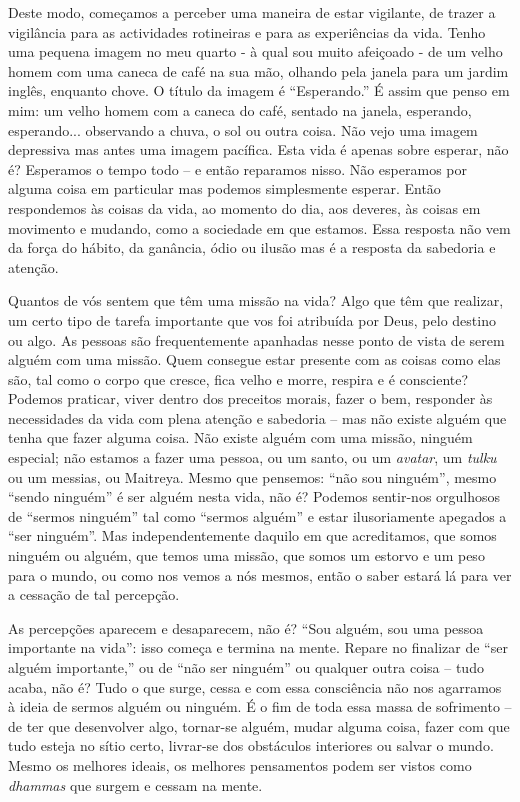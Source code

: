 Deste modo, começamos a perceber uma maneira de estar vigilante, de
trazer a vigilância para as actividades rotineiras e para as
experiências da vida. Tenho uma pequena imagem no meu quarto - à qual
sou muito afeiçoado - de um velho homem com uma caneca de café na sua
mão, olhando pela janela para um jardim inglês, enquanto chove. O título
da imagem é ``Esperando.'' É assim que penso em mim: um velho homem com
a caneca do café, sentado na janela, esperando, esperando... observando
a chuva, o sol ou outra coisa. Não vejo uma imagem depressiva mas antes
uma imagem pacífica. Esta vida é apenas sobre esperar, não é? Esperamos
o tempo todo -- e então reparamos nisso. Não esperamos por alguma coisa
em particular  mas podemos simplesmente esperar. Então respondemos às
coisas da vida, ao momento do dia, aos deveres, às coisas em movimento e
mudando, como a sociedade em que estamos. Essa resposta não vem da força
do hábito, da ganância, ódio ou ilusão mas é a resposta da sabedoria e
atenção.

Quantos de vós sentem que têm uma missão na vida? Algo que têm que
realizar, um certo tipo de tarefa importante que vos foi atribuída por
Deus, pelo destino ou algo. As pessoas são frequentemente apanhadas
nesse ponto de vista de serem alguém com uma missão. Quem consegue estar
presente com as coisas como elas são, tal como o corpo que cresce, fica
velho e morre, respira e é consciente? Podemos praticar, viver dentro
dos preceitos morais, fazer o bem, responder às necessidades da vida com
plena atenção e sabedoria -- mas não existe alguém que tenha que fazer
alguma coisa. Não existe alguém com uma missão, ninguém especial; não
estamos a fazer uma pessoa, ou um santo, ou um \emph{avatar}, um
\emph{tulku} ou um messias, ou Maitreya. Mesmo que pensemos: ``não sou
ninguém'', mesmo ``sendo ninguém'' é ser alguém nesta vida, não é?
Podemos sentir-nos orgulhosos de ``sermos ninguém'' tal como ``sermos
alguém'' e estar ilusoriamente apegados a ``ser ninguém''. Mas
independentemente daquilo em que acreditamos, que somos ninguém ou
alguém, que temos uma missão, que somos um estorvo e um peso para o
mundo, ou como nos vemos a nós mesmos, então o saber estará lá para ver
a cessação de tal percepção.

As percepções aparecem e desaparecem, não é? ``Sou alguém, sou uma
pessoa importante na vida'': isso começa e termina na mente. Repare no
finalizar de ``ser alguém importante,'' ou de ``não ser ninguém'' ou
qualquer outra coisa -- tudo acaba, não é? Tudo o que surge, cessa e com
essa consciência não nos agarramos à ideia de sermos alguém ou ninguém.
É o fim de toda essa massa de sofrimento -- de ter que desenvolver algo,
tornar-se alguém, mudar alguma coisa, fazer com que tudo esteja no sítio
certo, livrar-se dos obstáculos interiores ou salvar o mundo. Mesmo os
melhores ideais, os melhores pensamentos podem ser vistos como
\emph{dhammas} que surgem e cessam na mente.

